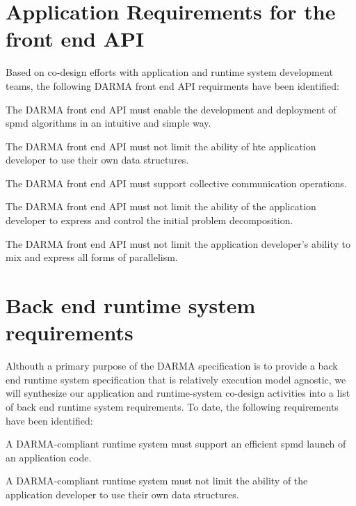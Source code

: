 \section{Application Requirements for the front end API}
Based on \gls{co-design} efforts with application and \gls{runtime system}
development teams, the following \gls{DARMA} \gls{front end} \gls{API}
requirments have been identified:
\begin{compactitem}
\item The \gls{DARMA} \gls{front end} \gls{API} must enable the development and
  deployment of \gls{spmd} algorithms in an intuitive and simple way.
\item The \gls{DARMA} \gls{front end} \gls{API} must not limit the ability of
  hte application developer to use their own data structures.
\item The \gls{DARMA} \gls{front end} \gls{API} must support collective
  communication operations.
\item The \gls{DARMA} \gls{front end} \gls{API} must not limit the ability of
      the application developer to express and control the initial problem
      decomposition.
\item The \gls{DARMA} \gls{front end} \gls{API} must not limit the application
  developer's ability to mix and express all forms of parallelism.
\end{compactitem}

\section{Back end runtime system requirements}
Althouth a primary purpose of the \gls{DARMA} specification is to provide a
\gls{back end} \gls{runtime system} specification that is relatively execution
model agnostic, we will synthesize our application and runtime-system co-design
activities into a list of \gls{back end} \gls{runtime system} requirements.  To
date, the following requirements have been identified:
\begin{compactitem}
\item A \gls{DARMA}-compliant \gls{runtime system} must support an efficient
  \gls{spmd} launch of an application code.
\item A \gls{DARMA}-compliant \gls{runtime system} must not limit the ability
  of the application developer to use their own data structures.
\end{compactitem}


